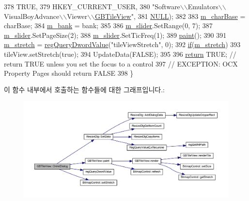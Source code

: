 \begin{DoxyCode}
378             TRUE,
379             HKEY\_CURRENT\_USER,
380             "Software\(\backslash\)\(\backslash\)Emulators\(\backslash\)\(\backslash\)VisualBoyAdvance\(\backslash\)\(\backslash\)Viewer\(\backslash\)\(\backslash\)\mbox{\hyperlink{class_g_b_tile_view}{GBTileView}}",
381             \mbox{\hyperlink{getopt1_8c_a070d2ce7b6bb7e5c05602aa8c308d0c4}{NULL}});
382 
383   \mbox{\hyperlink{class_g_b_tile_view_a0ad19c822952ef98ced0a46d051cb87e}{m\_charBase}} = charBase;
384   \mbox{\hyperlink{class_g_b_tile_view_a765264072397d9630d2f3ae8e58c414e}{m\_bank}} = bank;
385 
386   \mbox{\hyperlink{class_g_b_tile_view_ace72ce81e68876fe62cb85b09405e296}{m\_slider}}.SetRange(0, 7);
387   \mbox{\hyperlink{class_g_b_tile_view_ace72ce81e68876fe62cb85b09405e296}{m\_slider}}.SetPageSize(2);
388   \mbox{\hyperlink{class_g_b_tile_view_ace72ce81e68876fe62cb85b09405e296}{m\_slider}}.SetTicFreq(1);
389   \mbox{\hyperlink{class_g_b_tile_view_aa78a471956e777509644a0a04bab2c4d}{paint}}();
390 
391   \mbox{\hyperlink{class_g_b_tile_view_afaaee0263ecf447f8c628d0bbf1ff76f}{m\_stretch}} = \mbox{\hyperlink{_reg_8cpp_a150640889ffff4851ee26d7b999ec7c3}{regQueryDwordValue}}("tileViewStretch", 0);
392   \mbox{\hyperlink{arm-new_8h_a93120066fd6daa54150af823953378d1}{if}}(\mbox{\hyperlink{class_g_b_tile_view_afaaee0263ecf447f8c628d0bbf1ff76f}{m\_stretch}})
393     tileView.setStretch(true);
394   UpdateData(FALSE);
395   
396   \mbox{\hyperlink{gb_codes_8h_a9717e7bbecb906637e86cef6da3d83c2}{return}} TRUE;  \textcolor{comment}{// return TRUE unless you set the focus to a control}
397                 \textcolor{comment}{// EXCEPTION: OCX Property Pages should return FALSE}
398 \}
\end{DoxyCode}
이 함수 내부에서 호출하는 함수들에 대한 그래프입니다.\+:
\nopagebreak
\begin{figure}[H]
\begin{center}
\leavevmode
\includegraphics[width=350pt]{class_g_b_tile_view_a4d97fe7dcfd863756d993834548d2ca6_cgraph}
\end{center}
\end{figure}
\mbox{\label{class_g_b_tile_view_a865e1fe72caf57cc6d55700bfdac0a84}} 
